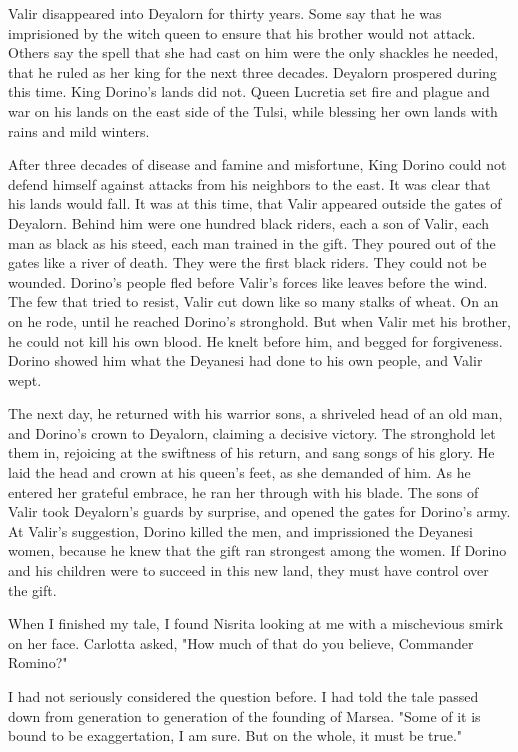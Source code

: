 \documentclass{article}
\begin{document}
Valir disappeared into Deyalorn for thirty years. Some say that he was imprisioned by the witch queen to ensure that his brother would not attack. Others say the spell that she had cast on him were the only shackles he needed, that he ruled as her king for the next three decades. Deyalorn prospered during this time. King Dorino's lands did not. Queen Lucretia set fire and plague and war on his lands on the east side of the Tulsi, while blessing her own lands with rains and mild winters. 

After three decades of disease and famine and misfortune, King Dorino could not defend himself against attacks from his neighbors to the east. It was clear that his lands would fall. It was at this time, that Valir appeared outside the gates of Deyalorn. Behind him were one hundred black riders, each a son of Valir, each man as black as his steed, each man trained in the gift. They poured out of the gates like a river of death. They were the first black riders. They could not be wounded. Dorino's people fled before Valir's forces like leaves before the wind. The few that tried to resist, Valir cut down like so many stalks of wheat. On an on he rode, until he reached Dorino's stronghold. But when Valir met his brother, he could not kill his own blood. He knelt before him, and begged for forgiveness. Dorino showed him what the Deyanesi had done to his own people, and Valir wept. 

The next day, he returned with his warrior sons, a shriveled head of an old man, and Dorino's crown to Deyalorn, claiming a decisive victory. The stronghold let them in, rejoicing at the swiftness of his return, and sang songs of his glory. He laid the head and crown at his queen's feet, as she demanded of him. As he entered her grateful embrace, he ran her through with his blade. The sons of Valir took Deyalorn's guards by surprise, and opened the gates for Dorino's army. At Valir's suggestion, Dorino killed the men, and imprissioned the Deyanesi women, because he knew that the gift ran strongest among the women. If Dorino and his children were to succeed in this new land, they must have control over the gift.

When I finished my tale, I found Nisrita looking at me with a mischevious smirk on her face. Carlotta asked, "How much of that do you believe, Commander Romino?"

I had not seriously considered the question before. I had told the tale passed down from generation to generation of the founding of Marsea. "Some of it is bound to be exaggertation, I am sure. But on the whole, it must be true."
\end{document}
